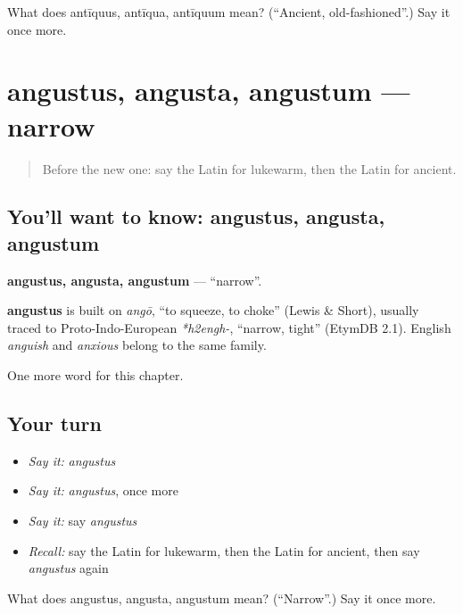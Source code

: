 \begin{tcolorbox}[breakable,colback=teal!4,colframe=teal!35!black,title={Before you move on}]
What does antīquus, antīqua, antīquum mean? (\textquotedblleft{}Ancient, old-fashioned\textquotedblright{}.) Say it once more.
\end{tcolorbox}
\section[angustus, angusta, angustum]{angustus, angusta, angustum — narrow}

\label{lesson:LA-C143-angustus}



\begin{quote}
Before the new one: say the Latin for lukewarm, then the Latin for ancient.
\end{quote}

\subsection*{You'll want to know: angustus, angusta, angustum}
\textbf{angustus, angusta, angustum} — \textquotedblleft{}narrow\textquotedblright{}.

\begin{cousinweb}
\textbf{angustus} is built on \emph{angō}, \textquotedblleft{}to squeeze, to choke\textquotedblright{} (Lewis \& Short), usually traced to Proto-Indo-European \emph{*h2engh-}, \textquotedblleft{}narrow, tight\textquotedblright{} (EtymDB 2.1). English \emph{anguish} and \emph{anxious} belong to the same family.
\end{cousinweb}

\begin{grammarlens}[title={What you've built}]
One more word for this chapter.
\end{grammarlens}

\subsection*{Your turn}
\begin{itemize}
\raggedright
  \item \emph{Say it:} \emph{angustus}
  \item \emph{Say it:} \emph{angustus}, once more
  \item \emph{Say it:} say \emph{angustus}
  \item \emph{Recall:} say the Latin for lukewarm, then the Latin for ancient, then say \emph{angustus} again
\end{itemize}

\begin{tcolorbox}[breakable,colback=teal!4,colframe=teal!35!black,title={Before you move on}]
What does angustus, angusta, angustum mean? (\textquotedblleft{}Narrow\textquotedblright{}.) Say it once more.
\end{tcolorbox}
